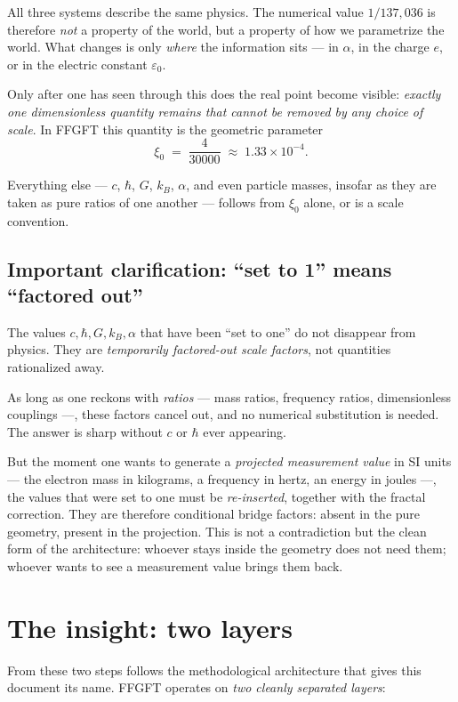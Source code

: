 All three systems describe the same physics. The numerical value
$1/137{,}036$ is therefore \emph{not} a property of the world, but a
property of how we parametrize the world. What changes is only
\emph{where} the information sits --- in $\alpha$, in the charge $e$,
or in the electric constant $\varepsilon_{0}$.

Only after one has seen through this does the real point become
visible: \emph{exactly one dimensionless quantity remains that cannot
be removed by any choice of scale}. In FFGFT this quantity is the
geometric parameter
\[
  \xi_{0} \;=\; \frac{4}{30000} \;\approx\; 1{.}33 \times 10^{-4}.
\]

Everything else --- $c$, $\hbar$, $G$, $k_B$, $\alpha$, and even
particle masses, insofar as they are taken as pure ratios of one
another --- follows from $\xi_{0}$ alone, or is a scale convention.

\subsection*{Important clarification: ``set to 1'' means ``factored out''}

The values $c, \hbar, G, k_B, \alpha$ that have been ``set to one'' do
not disappear from physics. They are \emph{temporarily factored-out
scale factors}, not quantities rationalized away.

As long as one reckons with \emph{ratios} --- mass ratios, frequency
ratios, dimensionless couplings ---, these factors cancel out, and no
numerical substitution is needed. The answer is sharp without $c$ or
$\hbar$ ever appearing.

But the moment one wants to generate a \emph{projected measurement
value} in SI units --- the electron mass in kilograms, a frequency in
hertz, an energy in joules ---, the values that were set to one must
be \emph{re-inserted}, together with the fractal correction. They are
therefore conditional bridge factors: absent in the pure geometry,
present in the projection. This is not a contradiction but the clean
form of the architecture: whoever stays inside the geometry does not
need them; whoever wants to see a measurement value brings them back.

\section{The insight: two layers}

From these two steps follows the methodological architecture that
gives this document its name. FFGFT operates on \emph{two cleanly
separated layers}:

